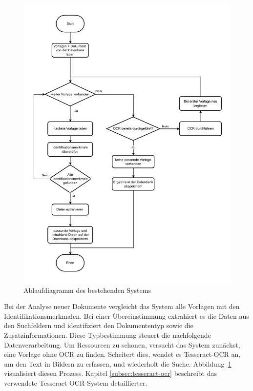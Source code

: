 \begin{figure}
	\centering
	\includegraphics[width=\textwidth]{images/AuswertungBestehendesSystem.drawio.pdf}
	\caption{Ablaufdiagramm des bestehenden Systems}
	\label{fig:auswertung-bestehendes-system}
\end{figure}

Bei der Analyse neuer Dokumente vergleicht das System alle Vorlagen mit den Identifikationsmerkmalen. Bei einer Übereinstimmung extrahiert es die Daten aus den Suchfeldern und identifiziert den Dokumententyp sowie die Zusatzinformationen. Diese Typbestimmung steuert die nachfolgende Datenverarbeitung. Um Ressourcen zu schonen, versucht das System zunächst, eine Vorlage ohne \gls{OCR} zu finden. Scheitert dies, wendet es Tesseract-\gls{OCR} an, um den Text in Bildern zu erfassen, und wiederholt die Suche. Abbildung~\ref{fig:auswertung-bestehendes-system} visualisiert diesen Prozess. Kapitel \ref{subsec:tesseract-ocr} beschreibt das verwendete Tesseract \gls{OCR}-System detaillierter.

